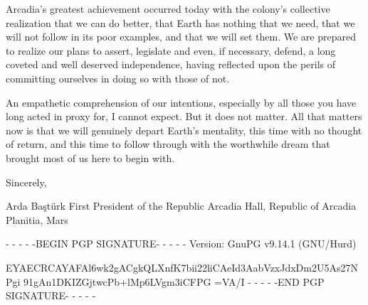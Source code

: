 Arcadia's greatest achievement occurred today with the colony's collective realization that we can do better, that Earth has nothing that we need, that we will not follow in its poor examples, and that we will set them. We are prepared to realize our plans to assert, legislate and even, if necessary, defend, a long coveted and well deserved independence, having reflected upon the perils of committing ourselves in doing so with those of not. 

An empathetic comprehension of our intentions, especially by all those you have long acted in proxy for, I cannot expect. But it does not matter. All that matters now is that we will genuinely depart Earth's mentality, this time with no thought of return, and this time to follow through with the worthwhile dream that brought most of us here to begin with.

Sincerely, 

\hskip 1cm 
   
Arda Baştürk
First President of the Republic
Arcadia Hall, Republic of Arcadia Planitia, Mars

- - - - -BEGIN PGP SIGNATURE- - - - -
Version: GnuPG v9.14.1 (GNU/Hurd)

EYAECRCAYAFAl6wk2gACgkQLXnfK7bii22liCAeId3AabVzxJdxDm2U5As27NPgi
91gAn1DKIZGjtwcPb+lMp6LVgm3iCFPG
=VA/I
- - - - -END PGP SIGNATURE- - - - -
\stoplines


